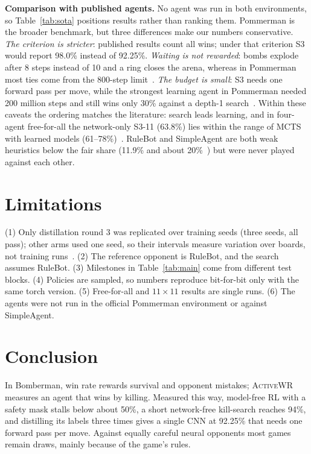 \documentclass[conference]{IEEEtran}
\newcommand{\awr}{\textsc{ActiveWR}}
\begin{document}
\textbf{Comparison with published agents.} No agent was run in both environments, so Table~\ref{tab:sota} positions results rather than ranking them. Pommerman is the broader benchmark, but three differences make our numbers conservative. \emph{The criterion is stricter}: published results count all wins; under that criterion S3 would report 98.0\% instead of 92.25\%. \emph{Waiting is not rewarded}: bombs explode after 8 steps instead of 10 and a ring closes the arena, whereas in Pommerman most ties come from the 800-step limit~\cite{weil2023}. \emph{The budget is small}: S3 needs one forward pass per move, while the strongest learning agent in Pommerman needed 200 million steps and still wins only 30\% against a depth-1 search~\cite{huynh2024,osogami2019}. Within these caveats the ordering matches the literature: search leads learning, and in four-agent free-for-all the network-only S3-11 (63.8\%) lies within the range of MCTS with learned models (61--78\%)~\cite{weil2023}. RuleBot and SimpleAgent are both weak heuristics below the fair share (11.9\% and about 20\%~\cite{resnick2018pommerman}) but were never played against each other.

\section{Limitations}
(1) Only distillation round 3 was replicated over training seeds (three seeds, all pass); other arms used one seed, so their intervals measure variation over boards, not training runs~\cite{henderson2018matters,agarwal2021precipice}. (2) The reference opponent is RuleBot, and the search assumes RuleBot. (3) Milestones in Table~\ref{tab:main} come from different test blocks. (4) Policies are sampled, so numbers reproduce bit-for-bit only with the same torch version. (5) Free-for-all and $11\times11$ results are single runs. (6) The agents were not run in the official Pommerman environment or against SimpleAgent.

\section{Conclusion}
In Bomberman, win rate rewards survival and opponent mistakes; \awr{} measures an agent that wins by killing. Measured this way, model-free RL with a safety mask stalls below about 50\%, a short network-free kill-search reaches 94\%, and distilling its labels three times gives a single CNN at 92.25\% that needs one forward pass per move. Against equally careful neural opponents most games remain draws, mainly because of the game's rules.
\end{document}
